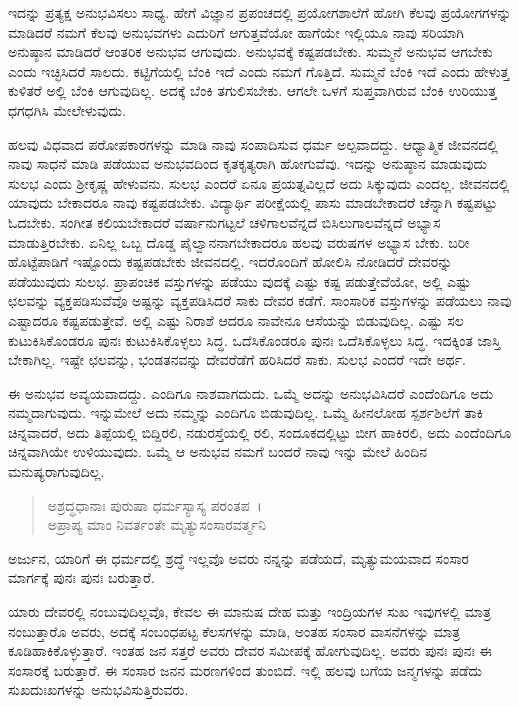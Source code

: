 ಇದನ್ನು ಪ್ರತ್ಯಕ್ಷ ಅನುಭವಿಸಲು ಸಾಧ್ಯ. ಹೇಗೆ ವಿಜ್ಞಾನ ಪ್ರಪಂಚದಲ್ಲಿ ಪ್ರಯೋಗಶಾಲೆಗೆ ಹೋಗಿ ಕೆಲವು ಪ್ರಯೋಗಗಳನ್ನು ಮಾಡಿದರೆ ನಮಗೆ ಕೆಲವು ಅನುಭವಗಳು ಎದುರಿಗೆ ಆಗುತ್ತವೆಯೋ ಹಾಗೆಯೇ ಇಲ್ಲಿಯೂ ನಾವು ಸರಿಯಾಗಿ ಅನುಷ್ಠಾನ ಮಾಡಿದರೆ ಆಂತರಿಕ ಅನುಭವ ಆಗುವುದು. ಅನುಭವಕ್ಕೆ ಕಷ್ಟಪಡಬೇಕು. ಸುಮ್ಮನೆ ಅನುಭವ ಆಗಬೇಕು ಎಂದು ಇಚ್ಛಿಸಿದರೆ ಸಾಲದು. ಕಟ್ಟಿಗೆಯಲ್ಲಿ ಬೆಂಕಿ ಇದೆ ಎಂದು ನಮಗೆ ಗೊತ್ತಿದೆ. ಸುಮ್ಮನೆ ಬೆಂಕಿ ಇದೆ ಎಂದು ಹೇಳುತ್ತ ಕುಳಿತರೆ ಅಲ್ಲಿ ಬೆಂಕಿ ಆಗುವುದಿಲ್ಲ. ಅದಕ್ಕೆ ಬೆಂಕಿ ತಗುಲಿಸಬೇಕು. ಆಗಲೇ ಒಳಗೆ ಸುಪ್ತವಾಗಿರುವ ಬೆಂಕಿ ಉರಿಯುತ್ತ ಧಗಧಗಿಸಿ ಮೇಲೇಳುವುದು.

ಹಲವು ವಿಧವಾದ ಪರೋಪಕಾರಗಳನ್ನು ಮಾಡಿ ನಾವು ಸಂಪಾದಿಸುವ ಧರ್ಮ ಅಲ್ಪವಾದದ್ದು. ಆಧ್ಯಾತ್ಮಿಕ ಜೀವನದಲ್ಲಿ ನಾವು ಸಾಧನೆ ಮಾಡಿ ಪಡೆಯುವ ಅನುಭವದಿಂದ ಕೃತಕೃತ್ಯರಾಗಿ ಹೋಗುವೆವು. ಇದನ್ನು ಅನುಷ್ಠಾನ ಮಾಡುವುದು ಸುಲಭ ಎಂದು ಶ‍್ರೀಕೃಷ್ಣ ಹೇಳುವನು. ಸುಲಭ ಎಂದರೆ ಏನೂ ಪ್ರಯತ್ನವಿಲ್ಲದೆ ಅದು ಸಿಕ್ಕುವುದು ಎಂದಲ್ಲ. ಜೀವನದಲ್ಲಿ ಯಾವುದು ಬೇಕಾದರೂ ನಾವು ಕಷ್ಟಪಡಬೇಕು. ವಿದ್ಯಾರ್ಥಿ ಪರೀಕ್ಷೆಯಲ್ಲಿ ಪಾಸು ಮಾಡಬೇಕಾದರೆ ಚೆನ್ನಾಗಿ ಕಷ್ಟಪಟ್ಟು ಓದಬೇಕು. ಸಂಗೀತ ಕಲಿಯಬೇಕಾದರೆ ವರ್ಷಾನುಗಟ್ಟಲೆ ಚಳಿಗಾಲವೆನ್ನದೆ ಬಿಸಿಲುಗಾಲವೆನ್ನದೆ ಅಭ್ಯಾಸ ಮಾಡುತ್ತಿರಬೇಕು. ಏನಿಲ್ಲ ಒಬ್ಬ ದೊಡ್ಡ ಪೈಲ್ವಾನನಾಗಬೇಕಾದರೂ ಹಲವು ವರುಷಗಳ ಅಭ್ಯಾಸ ಬೇಕು. ಬರೀ ಹೊಟ್ಟೆಪಾಡಿಗೆ ಇಷ್ಟೊಂದು ಕಷ್ಟಪಡಬೇಕು ಜೀವನದಲ್ಲಿ. ಇದರೊಂದಿಗೆ ಹೋಲಿಸಿ ನೋಡಿದರೆ ದೇವರನ್ನು ಪಡೆಯುವುದು ಸುಲಭ. ಪ್ರಾಪಂಚಿಕ ವಸ್ತುಗಳನ್ನು ಪಡೆಯು ವುದಕ್ಕೆ ಎಷ್ಟು ಕಷ್ಟ ಪಡುತ್ತೇವೆಯೋ, ಅಲ್ಲಿ ಎಷ್ಟು ಛಲವನ್ನು ವ್ಯಕ್ತಪಡಿಸುವೆವೊ ಅಷ್ಟನ್ನು ವ್ಯಕ್ತಪಡಿಸಿದರೆ ಸಾಕು ದೇವರ ಕಡೆಗೆ. ಸಾಂಸಾರಿಕ ವಸ್ತುಗಳನ್ನು ಪಡೆಯಲು ನಾವು ಎಷ್ಟಾದರೂ ಕಷ್ಟಪಡುತ್ತೇವೆ. ಅಲ್ಲಿ ಎಷ್ಟು ನಿರಾಶೆ ಆದರೂ ನಾವೇನೂ ಆಸೆಯನ್ನು ಬಿಡುವುದಿಲ್ಲ. ಎಷ್ಟು ಸಲ ಕುಟುಕಿಸಿಕೊಂಡರೂ ಪುನಃ ಕುಟುಕಿಸಿಕೊಳ್ಳಲು ಸಿದ್ಧ. ಒದೆಸಿಕೊಂಡರೂ ಪುನಃ ಒದೆಸಿಕೊಳ್ಳಲು ಸಿದ್ಧ. ಇದಕ್ಕಿಂತ ಜಾಸ್ತಿ ಬೇಕಾಗಿಲ್ಲ. ಇಷ್ಟೇ ಛಲವನ್ನು, ಭಂಡತನವನ್ನು ದೇವರೆಡೆಗೆ ಹರಿಸಿದರೆ ಸಾಕು. ಸುಲಭ ಎಂದರೆ ಇದೇ ಅರ್ಥ.

ಈ ಅನುಭವ ಅವ್ಯಯವಾದದ್ದು. ಎಂದಿಗೂ ನಾಶವಾಗದುದು. ಒಮ್ಮೆ ಅದನ್ನು ಅನುಭವಿಸಿದರೆ ಎಂದೆಂದಿಗೂ ಅದು ನಮ್ಮದಾಗುವುದು. ಇನ್ನುಮೇಲೆ ಅದು ನಮ್ಮನ್ನು ಎಂದಿಗೂ ಬಿಡುವುದಿಲ್ಲ. ಒಮ್ಮೆ ಹೀನಲೋಹ ಸ್ಪರ್ಶಶಿಲೆಗೆ ತಾಕಿ ಚಿನ್ನವಾದರೆ, ಅದು ತಿಪ್ಪೆಯಲ್ಲಿ ಬಿದ್ದಿರಲಿ, ನಡುರಸ್ತೆಯಲ್ಲಿ ರಲಿ, ಸಂದೂಕದಲ್ಲಿಟ್ಟು ಬೀಗ ಹಾಕಿರಲಿ, ಅದು ಎಂದೆಂದಿಗೂ ಚಿನ್ನವಾಗಿಯೇ ಉಳಿಯುವುದು. ಒಮ್ಮೆ ಆ ಅನುಭವ ನಮಗೆ ಬಂದರೆ ನಾವು ಇನ್ನು ಮೇಲೆ ಹಿಂದಿನ ಮನುಷ್ಯರಾಗುವುದಿಲ್ಲ.

\begin{verse}
ಅಶ್ರದ್ಧಧಾನಾಃ ಪುರುಷಾ ಧರ್ಮಸ್ಯಾಸ್ಯ ಪರಂತಪ~।\\ಅಪ್ರಾಪ್ಯ ಮಾಂ ನಿವರ್ತಂತೇ ಮೃತ್ಯುಸಂಸಾರವರ್ತ್ಮನಿ 
\end{verse}

{\small ಅರ್ಜುನ, ಯಾರಿಗೆ ಈ ಧರ್ಮದಲ್ಲಿ ಶ್ರದ್ಧೆ ಇಲ್ಲವೊ ಅವರು ನನ್ನನ್ನು ಪಡೆಯದೆ, ಮೃತ್ಯುಮಯವಾದ ಸಂಸಾರ ಮಾರ್ಗಕ್ಕೆ ಪುನಃ ಪುನಃ ಬರುತ್ತಾರೆ.}

ಯಾರು ದೇವರಲ್ಲಿ ನಂಬುವುದಿಲ್ಲವೊ, ಕೇವಲ ಈ ಮಾನುಷ ದೇಹ ಮತ್ತು ಇಂದ್ರಿಯಗಳ ಸುಖ ಇವುಗಳಲ್ಲಿ ಮಾತ್ರ ನಂಬುತ್ತಾರೊ ಅವರು, ಅದಕ್ಕೆ ಸಂಬಂಧಪಟ್ಟ ಕೆಲಸಗಳನ್ನು ಮಾಡಿ, ಅಂತಹ ಸಂಸಾರ ವಾಸನೆಗಳನ್ನು ಮಾತ್ರ ಕೂಡಿಹಾಕಿಕೊಳ್ಳುತ್ತಾರೆ. ಇಂತಹ ಜನ ಸತ್ತರೆ ಅವರು ದೇವರ ಸಮೀಪಕ್ಕೆ ಹೋಗುವುದಿಲ್ಲ. ಅವರು ಪುನಃ ಪುನಃ ಈ ಸಂಸಾರಕ್ಕೆ ಬರುತ್ತಾರೆ. ಈ ಸಂಸಾರ ಜನನ ಮರಣಗಳಿಂದ ತುಂಬಿದೆ. ಇಲ್ಲಿ ಹಲವು ಬಗೆಯ ಜನ್ಮಗಳನ್ನು ಪಡೆದು ಸುಖದುಃಖಗಳನ್ನು ಅನುಭವಿಸುತ್ತಿರುವರು.

